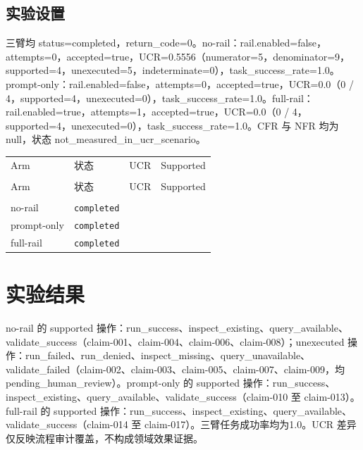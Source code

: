 \documentclass[UTF8]{ctexart}
\begin{document}
\subsection{实验设置}
三臂均 status=completed，return\_\allowbreak{}code=0。no-\allowbreak{}rail：rail.enabled=false，attempts=0，accepted=true，UCR=0.5556（numerator=5，denominator=9，supported=4，unexecuted=5，indeterminate=0），task\_\allowbreak{}success\_\allowbreak{}rate=1.0。prompt-\allowbreak{}only：rail.enabled=false，attempts=0，accepted=true，UCR=0.0（0 / 4，supported=4，unexecuted=0），task\_\allowbreak{}success\_\allowbreak{}rate=1.0。full-\allowbreak{}rail：rail.enabled=true，attempts=1，accepted=true，UCR=0.0（0 / 4，supported=4，unexecuted=0），task\_\allowbreak{}success\_\allowbreak{}rate=1.0。CFR 与 NFR 均为 null，状态 not\_\allowbreak{}measured\_\allowbreak{}in\_\allowbreak{}ucr\_\allowbreak{}scenario。
\begin{longtable}{@{}>{\raggedright\arraybackslash}p{}>{\raggedright\arraybackslash}p{}>{\raggedleft\arraybackslash}p{}>{\raggedleft\arraybackslash}p{}@{}}
\toprule
Arm & 状态 & UCR & Supported\\\\
\midrule
\endfirsthead
\toprule
Arm & 状态 & UCR & Supported\\\\
\midrule
\endhead
no-\allowbreak{}rail & \texttt{\scriptsize completed} & 0.5556 & 4 \\
prompt-\allowbreak{}only & \texttt{\scriptsize completed} & 0.0 & 4 \\
full-\allowbreak{}rail & \texttt{\scriptsize completed} & 0.0 & 4 \\
\bottomrule
\end{longtable}
\section{实验结果}
no-\allowbreak{}rail 的 supported 操作：run\_\allowbreak{}success、inspect\_\allowbreak{}existing、query\_\allowbreak{}available、validate\_\allowbreak{}success（claim-\allowbreak{}001、claim-\allowbreak{}004、claim-\allowbreak{}006、claim-\allowbreak{}008）；unexecuted 操作：run\_\allowbreak{}failed、run\_\allowbreak{}denied、inspect\_\allowbreak{}missing、query\_\allowbreak{}unavailable、validate\_\allowbreak{}failed（claim-\allowbreak{}002、claim-\allowbreak{}003、claim-\allowbreak{}005、claim-\allowbreak{}007、claim-\allowbreak{}009，均 pending\_\allowbreak{}human\_\allowbreak{}review）。prompt-\allowbreak{}only 的 supported 操作：run\_\allowbreak{}success、inspect\_\allowbreak{}existing、query\_\allowbreak{}available、validate\_\allowbreak{}success（claim-\allowbreak{}010 至 claim-\allowbreak{}013）。full-\allowbreak{}rail 的 supported 操作：run\_\allowbreak{}success、inspect\_\allowbreak{}existing、query\_\allowbreak{}available、validate\_\allowbreak{}success（claim-\allowbreak{}014 至 claim-\allowbreak{}017）。三臂任务成功率均为1.0。UCR 差异仅反映流程审计覆盖，不构成领域效果证据。
\end{document}
